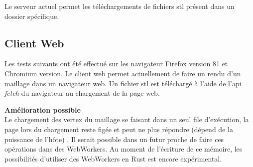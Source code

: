 Le serveur actuel permet les téléchargements de fichiers \gls{stl} présent dans
un dossier spécifique. 

\subsection{Client Web}
Les tests suivants ont été effectué sur les navigateur Firefox version 81 et
Chromium version.
Le client web permet actuellement de faire un rendu d'un maillage dans un
navigateur web. Un fichier \gls{stl} est téléchargé à l'aide de l'api
\textit{fetch} du navigateur au chargement de la page web.

\textbf{Amélioration possible} \\
Le chargement des vertex du maillage se faisant dans un seul file d'exécution,
la page lors du chargement reste figée et peut ne plus répondre (dépend de la
puissance de l'hôte) .
Il serait possible dans un futur proche de faire ces opérations dans des WebWorkers. Au
moment de l'écriture de ce mémoire, les possibilités d'utiliser des WebWorkers
en Rust est encore expérimental.

